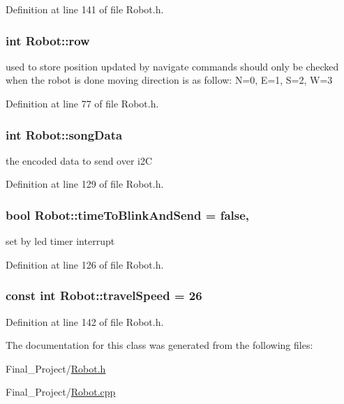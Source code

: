 Definition at line 141 of file Robot.\-h.

\hypertarget{classRobot_a35ce5c416a079fcf6b943843ec151d63}{
\subsubsection[{row}]{\setlength{\rightskip}{0pt plus 5cm}int Robot\-::row}}\label{classRobot_a35ce5c416a079fcf6b943843ec151d63}


used to store position updated by navigate commands should only be checked when the robot is done moving direction is as follow\-: N=0, E=1, S=2, W=3 



Definition at line 77 of file Robot.\-h.

\hypertarget{classRobot_a7818916adfa736ab4cb21011fe302cdb}{
\subsubsection[{song\-Data}]{\setlength{\rightskip}{0pt plus 5cm}int Robot\-::song\-Data\hspace{0.3cm}{\ttfamily [private]}}}\label{classRobot_a7818916adfa736ab4cb21011fe302cdb}


the encoded data to send over i2\-C 



Definition at line 129 of file Robot.\-h.

\hypertarget{classRobot_aa074884ad594acf20282805c811adaff}{
\subsubsection[{time\-To\-Blink\-And\-Send}]{\setlength{\rightskip}{0pt plus 5cm}bool Robot\-::time\-To\-Blink\-And\-Send = false\hspace{0.3cm}{\ttfamily [static]}, {\ttfamily [private]}}}\label{classRobot_aa074884ad594acf20282805c811adaff}


set by led timer interrupt 



Definition at line 126 of file Robot.\-h.

\hypertarget{classRobot_a87ec942d7d53b1a4b1c46422f6a134eb}{
\subsubsection[{travel\-Speed}]{\setlength{\rightskip}{0pt plus 5cm}const int Robot\-::travel\-Speed = 26\hspace{0.3cm}{\ttfamily [private]}}}\label{classRobot_a87ec942d7d53b1a4b1c46422f6a134eb}


Definition at line 142 of file Robot.\-h.



The documentation for this class was generated from the following files\-:\begin{DoxyCompactItemize}
\item 
Final\-\_\-\-Project/\hyperlink{Robot_8h}{Robot.\-h}\item 
Final\-\_\-\-Project/\hyperlink{Robot_8cpp}{Robot.\-cpp}\end{DoxyCompactItemize}
